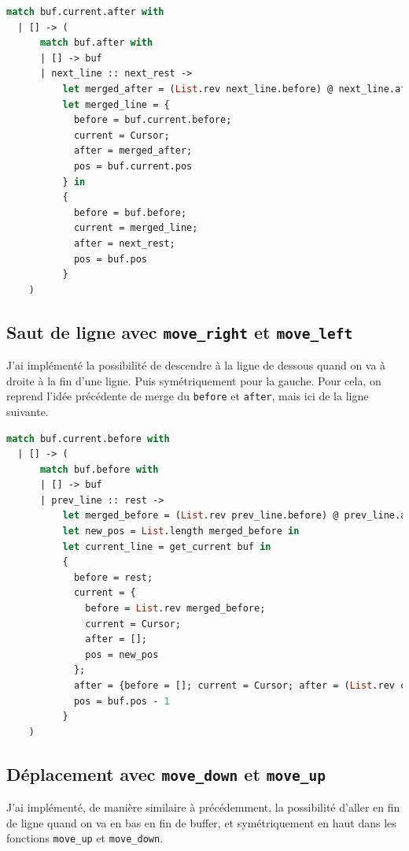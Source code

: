\documentclass[a4paper,12pt]{article}
\begin{document}
\begin{lstlisting}[language=Caml, caption=Extrait de l'implémentation ergonomique de la suppression avec \texttt{do\_suppr}]
match buf.current.after with
  | [] -> (
      match buf.after with
      | [] -> buf
      | next_line :: next_rest ->
          let merged_after = (List.rev next_line.before) @ next_line.after in
          let merged_line = {
            before = buf.current.before;
            current = Cursor;
            after = merged_after;
            pos = buf.current.pos
          } in
          {
            before = buf.before;
            current = merged_line;
            after = next_rest;
            pos = buf.pos
          }
    )
\end{lstlisting}

\subsection{Saut de ligne avec \texttt{move\_right} et \texttt{move\_left}}
J'ai implémenté la possibilité de descendre à la ligne de dessous quand on va à droite à la fin d'une ligne. Puis symétriquement pour la gauche. Pour cela, on reprend l'idée précédente de merge du \texttt{before} et \texttt{after}, mais ici de la ligne suivante.
\begin{lstlisting}[language=Caml, caption=Extrait de code de la fonction \texttt{move\_left}]
match buf.current.before with
  | [] -> (
      match buf.before with
      | [] -> buf
      | prev_line :: rest ->
          let merged_before = (List.rev prev_line.before) @ prev_line.after in
          let new_pos = List.length merged_before in
          let current_line = get_current buf in
          {
            before = rest;
            current = {
              before = List.rev merged_before;
              current = Cursor;
              after = [];
              pos = new_pos
            };
            after = {before = []; current = Cursor; after = (List.rev current_line.before) @ current_line.after; pos = 0} :: buf.after;
            pos = buf.pos - 1
          }
    )
\end{lstlisting}

\subsection{Déplacement avec \texttt{move\_down} et \texttt{move\_up}}
J'ai implémenté, de manière similaire à précédemment, la possibilité d'aller en fin de ligne quand on va en bas en fin de buffer, et symétriquement en haut dans les fonctions \texttt{move\_up} et \texttt{move\_down}.
\end{document}

